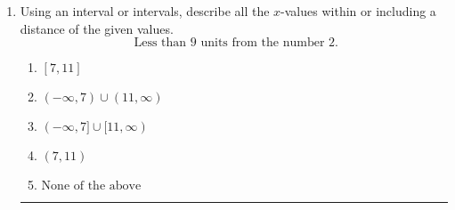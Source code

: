 \documentclass[14pt]{extbook}
\newcommand{\litem}[1]{\item#1\hspace*{-1cm}\rule{\textwidth}{0.4pt}}
\begin{document}
\begin{enumerate}
{\begin{enumerate}[label=\Alph*.]
\end{enumerate} }
\litem{
Using an interval or intervals, describe all the $x$-values within or including a distance of the given values.\[ \text{ Less than } 9 \text{ units from the number } 2. \]\begin{enumerate}[label=\Alph*.]
\item \( [7, 11] \)
\item \( (-\infty, 7) \cup (11, \infty) \)
\item \( (-\infty, 7] \cup [11, \infty) \)
\item \( (7, 11) \)
\item \( \text{None of the above} \)

\end{enumerate} }
\end{enumerate}
\end{document}
